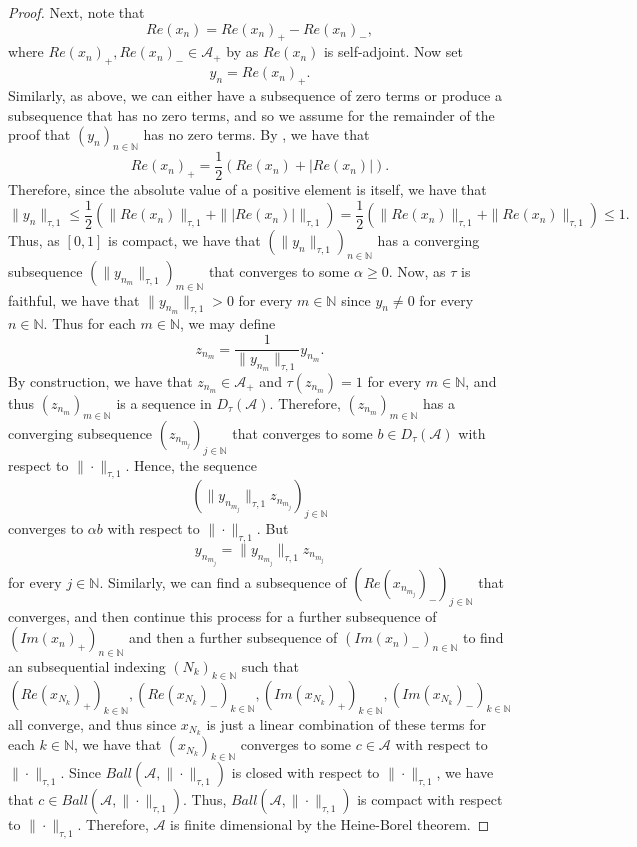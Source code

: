 \documentclass{amsart}
\theoremstyle{plain}
\theoremstyle{definition}
\theoremstyle{remark}
\numberwithin{equation}{section}
\newcommand{\A}{{\mathcal{A}}}
\newcommand{\N}{{\mathds{N}}}
\renewcommand{\geq}{\geqslant}
\renewcommand{\leq}{\leqslant}
\begin{document}
\begin{proof}
    Next, note that 
    \[
    Re(x_n)=Re(x_n)_+-Re(x_n)_-,
    \]
    where $Re(x_n)_+,Re(x_n)_-\in \A_+$ by \cite[Corollary I.4.2]{Davidson} as $Re(x_n)$ is self-adjoint. Now set \[y_n=Re(x_n)_+.\]
    Similarly, as above, we can either have a subsequence of zero terms or produce a subsequence that has no zero terms, and so we assume for the remainder of the proof that $(y_n)_{n\in \N}$ has no zero terms. 
By \cite[Corollary I.4.2]{Davidson}, we have that 
\[
Re(x_n)_+=\frac{1}{2}(Re(x_n)+|Re(x_n)|).
\]
Therefore, since the absolute value of a positive element is itself, we have that 
\[
\|y_n\|_{\tau,1}\leq \frac{1}{2}(\|Re(x_n)\|_{\tau,1}+\||Re(x_n)|\|_{\tau,1})=\frac{1}{2}(\|Re(x_n)\|_{\tau,1}+\|Re(x_n)\|_{\tau,1})\leq 1.
\]
Thus, as $[0,1]$ is compact, we have that $(\|y_n\|_{\tau,1})_{n \in \N}$ has a converging subsequence $(\|y_{n_m}\|_{\tau,1})_{m\in \N}$ that converges to some $\alpha \geq 0$.  Now, as $\tau$ is faithful, we have that $\|y_{n_m}\|_{\tau,1}>0$ for every $m \in \N$ since $y_{n} \neq 0$ for every $n\in \N$. Thus for each $m\in \N$, we may define
\[
z_{n_m}=\frac{1}{\|y_{n_m}\|_{\tau,1}}y_{n_m}.
\]
By construction, we have that $z_{n_m}\in \A_+$ and $\tau(z_{n_m})=1$ for every $m\in \N$, and thus $(z_{n_m})_{m\in \N}$ is a sequence in $D_\tau(\A)$. Therefore, $(z_{n_m})_{m\in \N}$ has a converging subsequence $(z_{n_{m_j}})_{j\in \N}$  that converges to some $b\in D_\tau(\A)$ with respect to $\|\cdot\|_{\tau,1}$. Hence, the sequence 
\[
(\|y_{n_{m_j}}\|_{\tau,1}z_{n_{m_j}})_{j\in \N}
\]
converges to $\alpha b$ with respect to $\|\cdot\|_{\tau,1}$. But 
\[
y_{n_{m_j}}=\|y_{n_{m_j}}\|_{\tau,1}z_{n_{m_j}}
\]
for every $j\in \N$. Similarly, we can find a subsequence of $(Re(x_{n_{m_j}})_-)_{j\in \N}$ that converges, and then continue this process for a further  subsequence of  $(Im(x_n)_+)_{n\in \N}$ and then a  further subsequence of $(Im(x_n)_-)_{n\in \N}$ to find an subsequential indexing $(N_k)_{k\in \N}$ such that 
\[
(Re(x_{N_k})_+)_{k\in \N}, (Re(x_{N_k})_-)_{k\in \N}, (Im(x_{N_k})_+)_{k\in \N}, (Im(x_{N_k})_-)_{k\in \N}
\]
all converge, and thus since   $x_{N_k}$ is just a linear combination of these terms for each $k\in \N$, we have that $(x_{N_k})_{k\in \N}$ converges to some $c\in \A$ with respect to $\|\cdot\|_{\tau,1}$. Since $ Ball(\A, \|\cdot\|_{\tau,1})$ is closed with respect to $\|\cdot\|_{\tau,1}$, we have that  $c\in Ball(\A, \|\cdot\|_{\tau,1})$. Thus, $ Ball(\A, \|\cdot\|_{\tau,1})$ is compact with respect to $\|\cdot\|_{\tau,1}$. Therefore, $\A$ is finite dimensional by the Heine-Borel theorem.
\end{proof}
\end{document}
